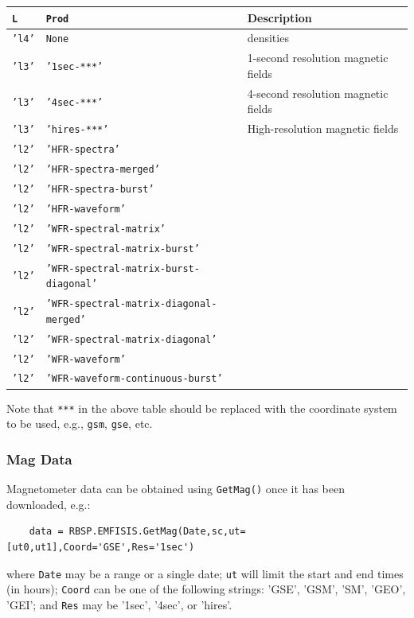 	\begin{tabular}{|l|l|l|}
	\hline
	\texttt{L} & \texttt{Prod} & Description \\
	\hline
	\texttt{'l4'} & \texttt{None} & densities \\
	\texttt{'l3'} & \texttt{'1sec-***'} & 1-second resolution magnetic fields \\
	\texttt{'l3'} & \texttt{'4sec-***'} & 4-second resolution magnetic fields \\
	\texttt{'l3'} & \texttt{'hires-***'} & High-resolution magnetic fields \\
	\texttt{'l2'} & \texttt{'HFR-spectra'} & \\
	\texttt{'l2'} & \texttt{'HFR-spectra-merged'} & \\
	\texttt{'l2'} & \texttt{'HFR-spectra-burst'} & \\
	\texttt{'l2'} & \texttt{'HFR-waveform'} & \\
	\texttt{'l2'} & \texttt{'WFR-spectral-matrix'} & \\
	\texttt{'l2'} & \texttt{'WFR-spectral-matrix-burst'} & \\
	\texttt{'l2'} & \texttt{'WFR-spectral-matrix-burst-diagonal'} & \\
	\texttt{'l2'} & \texttt{'WFR-spectral-matrix-diagonal-merged'} & \\
	\texttt{'l2'} & \texttt{'WFR-spectral-matrix-diagonal'} & \\
	\texttt{'l2'} & \texttt{'WFR-waveform'} & \\
	\texttt{'l2'} & \texttt{'WFR-waveform-continuous-burst'} & \\
	\hline
	\end{tabular}
	
	Note that \texttt{***} in the above table should be replaced with the coordinate system to be used, e.g., \texttt{gsm}, \texttt{gse}, etc.
	
	\subsubsection{Mag Data}
	
	Magnetometer data can be obtained using \texttt{GetMag()} once it has been downloaded, e.g.:
	
	\begin{verbatim}
	data = RBSP.EMFISIS.GetMag(Date,sc,ut=[ut0,ut1],Coord='GSE',Res='1sec')
	\end{verbatim}
	
	where \texttt{Date} may be a range or a single date; \texttt{ut} will limit the start and end times (in hours); \texttt{Coord} can be one of the following strings: 'GSE', 'GSM', 'SM', 'GEO', 'GEI'; and \texttt{Res} may be '1sec', '4sec', or 'hires'.
	
